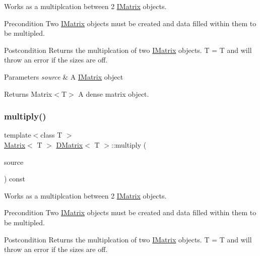 Works as a multiplcation between 2 \mbox{\hyperlink{class_i_matrix}{I\+Matrix}} objects. 

\begin{DoxyPrecond}{Precondition}
Two \mbox{\hyperlink{class_i_matrix}{I\+Matrix}} objects must be created and data filled within them to be multipled. 
\end{DoxyPrecond}
\begin{DoxyPostcond}{Postcondition}
Returns the multiplcation of two \mbox{\hyperlink{class_i_matrix}{I\+Matrix}} objects. T = T and will throw an error if the sizes are off.
\end{DoxyPostcond}

\begin{DoxyParams}{Parameters}
{\em source} & A \mbox{\hyperlink{class_i_matrix}{I\+Matrix}} object \\
\hline
\end{DoxyParams}
\begin{DoxyReturn}{Returns}
Matrix$<$\+T$>$ A dense matrix object. 
\end{DoxyReturn}
\mbox{\label{class_d_matrix_a0c935ff687d7a824da067a1f7f152dd6}} 
\subsubsection{\texorpdfstring{multiply()}{multiply()}\hspace{0.1cm}{\footnotesize\ttfamily [2/6]}}
{\footnotesize\ttfamily template$<$class T $>$ \\
\mbox{\hyperlink{class_matrix}{Matrix}}$<$ T $>$ \mbox{\hyperlink{class_d_matrix}{D\+Matrix}}$<$ T $>$\+::multiply (\begin{DoxyParamCaption}\item[{const \mbox{\hyperlink{class_i_matrix}{I\+Matrix}}$<$ \mbox{\hyperlink{class_t_matrix}{T\+Matrix}}$<$ T $>$, T $>$ \&}]{source }\end{DoxyParamCaption}) const}



Works as a multiplcation between 2 \mbox{\hyperlink{class_i_matrix}{I\+Matrix}} objects. 

\begin{DoxyPrecond}{Precondition}
Two \mbox{\hyperlink{class_i_matrix}{I\+Matrix}} objects must be created and data filled within them to be multipled. 
\end{DoxyPrecond}
\begin{DoxyPostcond}{Postcondition}
Returns the multiplcation of two \mbox{\hyperlink{class_i_matrix}{I\+Matrix}} objects. T = T and will throw an error if the sizes are off.
\end{DoxyPostcond}

